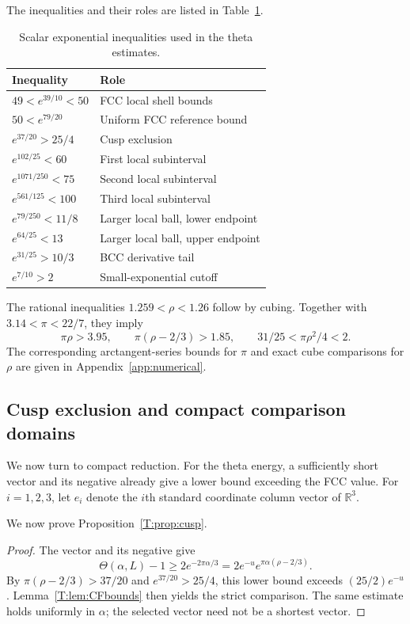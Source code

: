 \documentclass[reqno,english]{amsart}
\theoremstyle{definition}
\newtheorem{open problem}[theorem]{Open Problem}
\theoremstyle{remark}
\theoremstyle{plain}
\newcommand{\R}{{\mathbb R}}
\numberwithin{equation}{section}
\newcommand{\Th}{\Theta}
\begin{document}
The inequalities and their roles are listed in Table~\ref{T:tab:constants}.
\begin{table}[!htbp]
\centering
\caption{Scalar exponential inequalities used in the theta estimates.}\label{T:tab:constants}
\begin{tabular}{@{}ll@{}}
\toprule
Inequality & Role\\
\midrule
$49<e^{39/10}<50$ & FCC local shell bounds\\
$50<e^{79/20}$ & Uniform FCC reference bound\\
$e^{37/20}>25/4$ & Cusp exclusion\\
$e^{102/25}<60$ & First local subinterval\\
$e^{1071/250}<75$ & Second local subinterval\\
$e^{561/125}<100$ & Third local subinterval\\
$e^{79/250}<11/8$ & Larger local ball, lower endpoint\\
$e^{64/25}<13$ & Larger local ball, upper endpoint\\
$e^{31/25}>10/3$ & BCC derivative tail\\
$e^{7/10}>2$ & Small-exponential cutoff\\
\bottomrule
\end{tabular}
\end{table}
The rational inequalities $1.259<\rho<1.26$ follow by cubing. Together with $3.14<\pi<22/7$, they imply
\[
 \pi\rho>3.95,\qquad
 \pi(\rho-2/3)>1.85,\qquad
 31/25<\pi\rho^2/4<2.
\]
The corresponding arctangent-series bounds for $\pi$ and exact cube comparisons for $\rho$ are given in Appendix~\ref{app:numerical}.

\subsection{Cusp exclusion and compact comparison domains}\label{sec:cusps}
We now turn to compact reduction. For the theta energy, a sufficiently
short vector and its negative already give a lower bound exceeding the
FCC value. For $i=1,2,3$, let $e_i$ denote the $i$th standard coordinate
column vector of $\R^3$.

We now prove Proposition~\ref{T:prop:cusp}.

\begin{proof}
The vector and its negative give
\[
 \Th(\alpha,L)-1\ge2e^{-2\pi\alpha/3}
 =2e^{-u}e^{\pi\alpha(\rho-2/3)}.
\]
By $\pi(\rho-2/3)>37/20$ and $e^{37/20}>25/4$, this lower bound
exceeds $(25/2)e^{-u}$. Lemma~\ref{T:lem:CFbounds} then yields the
strict comparison. The same estimate holds uniformly in $\alpha$;
the selected vector need not be a shortest vector.
\end{proof}
\end{document}

